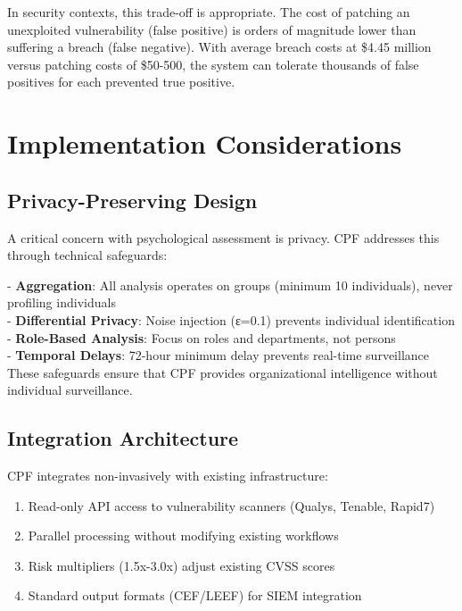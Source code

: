 \documentclass[11pt,a4paper]{article}
\begin{document}
In security contexts, this trade-off is appropriate. The cost of patching an unexploited vulnerability (false positive) is orders of magnitude lower than suffering a breach (false negative). With average breach costs at \$4.45 million\cite{ibm2023} versus patching costs of \$50-500, the system can tolerate thousands of false positives for each prevented true positive.

\section{Implementation Considerations}

\subsection{Privacy-Preserving Design}

A critical concern with psychological assessment is privacy. CPF addresses this through technical safeguards:

- \textbf{Aggregation}: All analysis operates on groups (minimum 10 individuals), never profiling individuals\\
- \textbf{Differential Privacy}: Noise injection (ε=0.1) prevents individual identification\\
- \textbf{Role-Based Analysis}: Focus on roles and departments, not persons\\
- \textbf{Temporal Delays}: 72-hour minimum delay prevents real-time surveillance\\

These safeguards ensure that CPF provides organizational intelligence without individual surveillance.

\subsection{Integration Architecture}

CPF integrates non-invasively with existing infrastructure:

\begin{enumerate}
\item Read-only API access to vulnerability scanners (Qualys, Tenable, Rapid7)
\item Parallel processing without modifying existing workflows
\item Risk multipliers (1.5x-3.0x) adjust existing CVSS scores
\item Standard output formats (CEF/LEEF) for SIEM integration
\end{enumerate}
\end{document}
